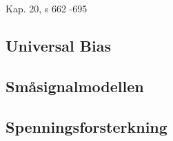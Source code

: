 Kap. 20, s 662 -695

\subsection{Universal Bias}
  

\subsection{Småsignalmodellen}
  

\subsection{Spenningsforsterkning}
  
